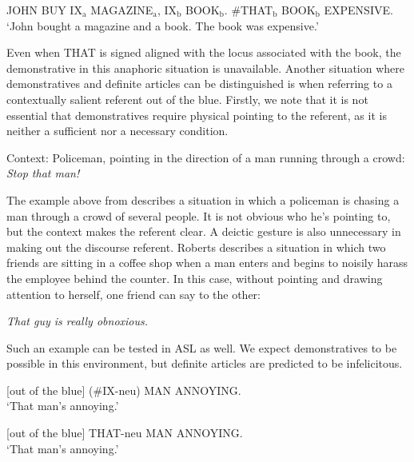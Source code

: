 \documentclass[output=paper,
modfonts
]{langscibook}
\begin{document}
\begin{exe}
\ex \label{ex:irani:28} JOHN BUY IX$_\text{a}$ MAGAZINE$_\text{a}$, IX$_\text{b}$ BOOK$_\text{b}$. \#THAT$_\text{b}$ BOOK$_\text{b}$ EXPENSIVE.\\
`John bought a magazine and a book. The book was expensive.'
\end{exe}

\noindent Even when THAT is signed aligned with the locus associated with the book, the demonstrative in this anaphoric situation is unavailable. Another situation where demonstratives and definite articles can be distinguished is when referring to a contextually salient referent out of the blue. Firstly, we note that it is not essential that demonstratives require physical pointing to the referent, as it is neither a sufficient nor a necessary condition.

\begin{exe}
\ex Context: Policeman, pointing in the direction of a man running through a crowd:\\ \textit{Stop that man!} \citep[121]{Roberts2002}
\end{exe}

\noindent The example above from \citet{Roberts2002} describes a situation in which a policeman is chasing a man through a crowd of several people. It is not obvious who he's pointing to, but the context makes the referent clear. A deictic gesture is also unnecessary in making out the discourse referent. Roberts describes a situation in which two friends are sitting in a coffee shop when a man enters and begins to noisily harass the employee behind the counter. In this case, without pointing and drawing attention to herself, one friend can say to the other:

\begin{exe}
\ex \textit{That guy is really obnoxious.} \citep[121]{Roberts2002} 
\end{exe} 

Such an example can be tested in ASL as well. We expect demonstratives to be possible in this environment, but definite articles are predicted to be infelicitous. 

\begin{exe}
\ex \label{ex:irani:31} [out of the blue] (\#IX-neu) MAN ANNOYING.\\
`That man's annoying.'

\ex \label{ex:irani:32} [out of the blue] THAT-neu MAN ANNOYING.\\
`That man's annoying.'
\end{exe}
\end{document}
